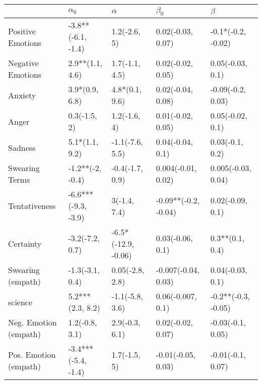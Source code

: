 \begin{tabular}{lllll}
\toprule
{} &           $\alpha_0$ &             $\alpha$ &             $\beta_0$ &              $\beta$ \\
\midrule
Positive Emotions     &   -3.8**(-6.1, -1.4) &         1.2(-2.6, 5) &     0.02(-0.03, 0.07) &   -0.1*(-0.2, -0.02) \\
Negative Emotions     &      2.9**(1.1, 4.6) &       1.7(-1.1, 4.5) &     0.02(-0.02, 0.05) &     0.05(-0.03, 0.1) \\
Anxiety               &       3.9*(0.9, 6.8) &       4.8*(0.1, 9.6) &     0.02(-0.04, 0.08) &    -0.09(-0.2, 0.03) \\
Anger                 &         0.3(-1.5, 2) &         1.2(-1.6, 4) &     0.01(-0.02, 0.05) &     0.05(-0.02, 0.1) \\
Sadness               &       5.1*(1.1, 9.2) &      -1.1(-7.6, 5.5) &      0.04(-0.04, 0.1) &      0.03(-0.1, 0.2) \\
Swearing Terms        &     -1.2**(-2, -0.4) &      -0.4(-1.7, 0.9) &    0.004(-0.01, 0.02) &   0.005(-0.03, 0.04) \\
Tentativeness         &  -6.6***(-9.3, -3.9) &         3(-1.4, 7.4) &  -0.09**(-0.2, -0.04) &     0.02(-0.09, 0.1) \\
Certainty             &      -3.2(-7.2, 0.7) &  -6.5*(-12.9, -0.06) &      0.03(-0.06, 0.1) &      0.3**(0.1, 0.4) \\
Swearing (empath)     &      -1.3(-3.1, 0.4) &      0.05(-2.8, 2.8) &   -0.007(-0.04, 0.03) &     0.04(-0.03, 0.1) \\
science               &     5.2***(2.3, 8.2) &      -1.1(-5.8, 3.6) &     0.06(-0.007, 0.1) &  -0.2**(-0.3, -0.05) \\
Neg. Emotion (empath) &       1.2(-0.8, 3.1) &       2.9(-0.3, 6.1) &     0.02(-0.02, 0.07) &    -0.03(-0.1, 0.05) \\
Pos. Emotion (empath) &  -3.4***(-5.4, -1.4) &         1.7(-1.5, 5) &    -0.01(-0.05, 0.03) &    -0.01(-0.1, 0.07) \\
\bottomrule
\end{tabular}
